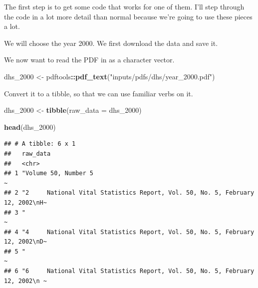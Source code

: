 \documentclass[
]{book}
\newenvironment{Shaded}{\begin{snugshade}}{\end{snugshade}}
\newcommand{\DataTypeTok}[1]{\textcolor[rgb]{0.13,0.29,0.53}{#1}}
\newcommand{\DecValTok}[1]{\textcolor[rgb]{0.00,0.00,0.81}{#1}}
\newcommand{\KeywordTok}[1]{\textcolor[rgb]{0.13,0.29,0.53}{\textbf{#1}}}
\newcommand{\NormalTok}[1]{#1}
\newcommand{\OperatorTok}[1]{\textcolor[rgb]{0.81,0.36,0.00}{\textbf{#1}}}
\newcommand{\StringTok}[1]{\textcolor[rgb]{0.31,0.60,0.02}{#1}}
\begin{document}
The first step is to get some code that works for one of them. I'll step through the code in a lot more detail than normal because we're going to use these pieces a lot.

We will choose the year 2000. We first download the data and save it.

\begin{Shaded}
\end{Shaded}

We now want to read the PDF in as a character vector.

\begin{Shaded}
\begin{Highlighting}[]
\NormalTok{dhs_}\DecValTok{2000}\NormalTok{ <-}\StringTok{ }\NormalTok{pdftools}\OperatorTok{::}\KeywordTok{pdf_text}\NormalTok{(}\StringTok{"inputs/pdfs/dhs/year_2000.pdf"}\NormalTok{)}
\end{Highlighting}
\end{Shaded}

Convert it to a tibble, so that we can use familiar verbs on it.

\begin{Shaded}
\begin{Highlighting}[]
\NormalTok{dhs_}\DecValTok{2000}\NormalTok{ <-}\StringTok{ }\KeywordTok{tibble}\NormalTok{(}\DataTypeTok{raw_data =}\NormalTok{ dhs_}\DecValTok{2000}\NormalTok{)}

\KeywordTok{head}\NormalTok{(dhs_}\DecValTok{2000}\NormalTok{)}
\end{Highlighting}
\end{Shaded}

\begin{verbatim}
## # A tibble: 6 x 1
##   raw_data                                                                      
##   <chr>                                                                         
## 1 "Volume 50, Number 5                                                         ~
## 2 "2     National Vital Statistics Report, Vol. 50, No. 5, February 12, 2002\nH~
## 3 "                                                                            ~
## 4 "4     National Vital Statistics Report, Vol. 50, No. 5, February 12, 2002\nD~
## 5 "                                                                            ~
## 6 "6     National Vital Statistics Report, Vol. 50, No. 5, February 12, 2002\n ~
\end{verbatim}
\end{document}
